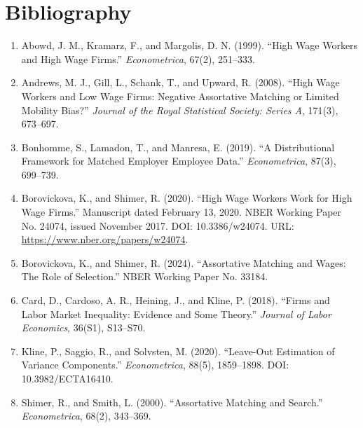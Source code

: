 \documentclass[11pt]{article}
\begin{document}
\section{Bibliography}

\begin{enumerate}[leftmargin=*]
  \item Abowd, J. M., Kramarz, F., and Margolis, D. N. (1999). ``High Wage Workers and High Wage Firms.'' \emph{Econometrica}, 67(2), 251--333.
  \item Andrews, M. J., Gill, L., Schank, T., and Upward, R. (2008). ``High Wage Workers and Low Wage Firms: Negative Assortative Matching or Limited Mobility Bias?'' \emph{Journal of the Royal Statistical Society: Series A}, 171(3), 673--697.
  \item Bonhomme, S., Lamadon, T., and Manresa, E. (2019). ``A Distributional Framework for Matched Employer Employee Data.'' \emph{Econometrica}, 87(3), 699--739.
  \item Borovickova, K., and Shimer, R. (2020). ``High Wage Workers Work for High Wage Firms.'' Manuscript dated February 13, 2020. NBER Working Paper No. 24074, issued November 2017. DOI: 10.3386/w24074. URL: \url{https://www.nber.org/papers/w24074}.
  \item Borovickova, K., and Shimer, R. (2024). ``Assortative Matching and Wages: The Role of Selection.'' NBER Working Paper No. 33184.
  \item Card, D., Cardoso, A. R., Heining, J., and Kline, P. (2018). ``Firms and Labor Market Inequality: Evidence and Some Theory.'' \emph{Journal of Labor Economics}, 36(S1), S13--S70.
  \item Kline, P., Saggio, R., and Solvsten, M. (2020). ``Leave-Out Estimation of Variance Components.'' \emph{Econometrica}, 88(5), 1859--1898. DOI: 10.3982/ECTA16410.
  \item Shimer, R., and Smith, L. (2000). ``Assortative Matching and Search.'' \emph{Econometrica}, 68(2), 343--369.
\end{enumerate}
\end{document}
